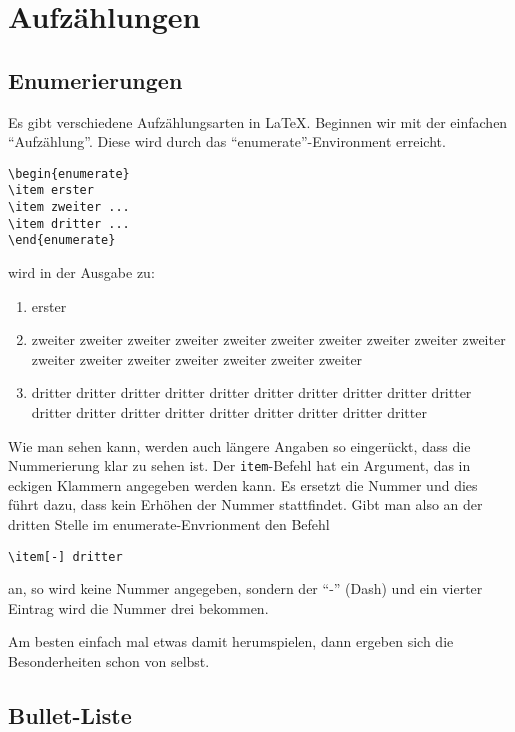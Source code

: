 \section{Aufzählungen}

\subsection{Enumerierungen}

Es gibt verschiedene Aufzählungsarten in \LaTeX. Beginnen wir mit der einfachen "`Aufzählung"'. Diese wird durch das "`enumerate"'-Environment erreicht.
\begin{verbatim}
\begin{enumerate}
\item erster
\item zweiter ...
\item dritter ...
\end{enumerate}
\end{verbatim}
wird in der Ausgabe zu:
\begin{enumerate}
\item erster
\item zweiter zweiter zweiter zweiter zweiter zweiter zweiter zweiter zweiter zweiter zweiter zweiter zweiter zweiter zweiter zweiter zweiter
\item dritter dritter dritter dritter dritter dritter dritter dritter dritter dritter dritter dritter dritter dritter dritter dritter dritter dritter dritter 
\end{enumerate}

Wie man sehen kann, werden auch längere Angaben so eingerückt, dass die Nummerierung klar zu sehen ist. Der \texttt{item}-Befehl hat ein Argument, das in eckigen Klammern angegeben werden kann. Es ersetzt die Nummer und dies führt dazu, dass kein Erhöhen der Nummer stattfindet. Gibt man also an der dritten Stelle im enumerate-Envrionment den Befehl
\begin{verbatim}
\item[-] dritter
\end{verbatim}
an, so wird keine Nummer angegeben, sondern der "`-"' (Dash) und ein vierter Eintrag wird die Nummer drei bekommen.

Am besten einfach mal etwas damit herumspielen, dann ergeben sich die Besonderheiten schon von selbst.

\subsection{Bullet-Liste}

